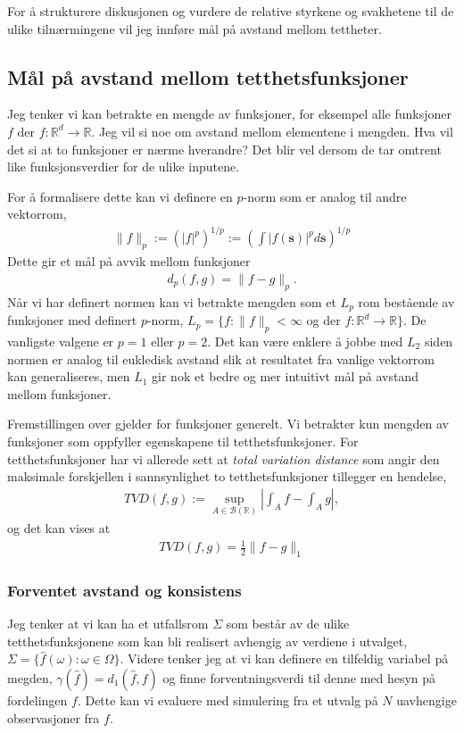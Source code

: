 For å strukturere diskusjonen og vurdere de relative styrkene og svakhetene til de ulike tilnærmingene vil jeg innføre mål på avstand mellom tettheter.
\subsection{Mål på avstand mellom tetthetsfunksjoner}
Jeg tenker vi kan betrakte en mengde av funksjoner, for eksempel alle funksjoner $f$ der $f:\mathbb{R}^d\to \mathbb{R}$. Jeg vil si noe om avstand mellom elementene i mengden. Hva vil det si at to funksjoner er nærme hverandre? Det blir vel dersom de tar omtrent like funksjonsverdier for de ulike inputene. 

For å formalisere dette kan vi definere en $p$-norm som er analog til andre vektorrom,
\begin{align}
\lVert f\rVert_p := \left(|f|^p\right)^{1/p}:= \left(\int |f(\mathbf{s})|^p d\mathbf{s}\right)^{1/p}
\end{align}
Dette gir et mål på avvik mellom funksjoner
\begin{align}
d_p(f,g)=\lVert f-g\rVert_p.
\end{align}
Når vi har definert normen kan vi betrakte mengden som et $L_p$ rom bestående av funksjoner med definert $p$-norm, $L_p = \{f:\lVert f\rVert_p < \infty$ og der $f:\mathbb{R}^d\to\mathbb{R}\}$. De vanligste valgene er $p=1$ eller $p=2$. Det kan være enklere å jobbe med $L_2$ siden normen er analog til eukledisk avstand slik at resultatet fra vanlige vektorrom kan generaliseres, men $L_1$ gir nok et bedre og mer intuitivt mål på avstand mellom funksjoner.

Fremstillingen over gjelder for funksjoner generelt. Vi betrakter kun mengden av funksjoner som oppfyller egenskapene til tetthetsfunksjoner. For tetthetsfunksjoner har vi allerede sett at \textit{total variation distance} som angir den maksimale forskjellen i sannsynlighet to tetthetsfunksjoner tillegger en hendelse,
\begin{align}
TVD(f,g) := \sup_{A \in \mathscr{B}(\mathbb{R})}\left|\int_A f - \int_A g \right|,
\end{align}
og det kan vises at
\begin{align}
TVD(f,g) = \frac{1}{2}\lVert f-g \rVert_1
\end{align}
\subsubsection{Forventet avstand og konsistens}
Jeg tenker at vi kan ha et utfallsrom $\Sigma$ som består av de ulike tetthetsfunksjonene som kan bli realisert avhengig av verdiene i utvalget, $\Sigma=\{\hat{f}(\omega):\omega \in \Omega\}$. Videre tenker jeg at vi kan definere en tilfeldig variabel på megden, $\gamma(\hat{f})=d_1(\hat{f},f)$ og finne forventningsverdi til denne med hesyn på fordelingen $f$. Dette kan vi evaluere med simulering fra et utvalg på $N$ uavhengige observasjoner fra $f$.


